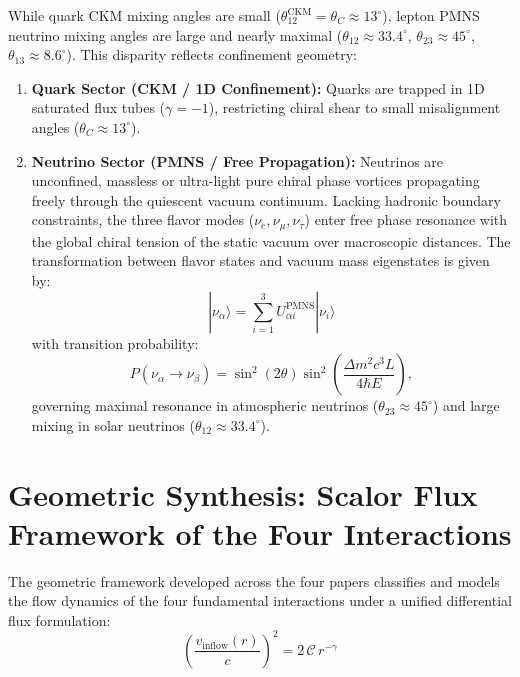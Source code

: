\documentclass[11pt,a4paper]{article}
\begin{document}
While quark CKM mixing angles are small ($\theta_{12}^{\mathrm{CKM}} = \theta_C \approx 13^\circ$), lepton PMNS~\cite{pmns1962} neutrino mixing angles are large and nearly maximal ($\theta_{12} \approx 33.4^\circ$, $\theta_{23} \approx 45^\circ$, $\theta_{13} \approx 8.6^\circ$). This disparity reflects confinement geometry:
\begin{enumerate}
    \item \textbf{Quark Sector (CKM / 1D Confinement):} Quarks are trapped in 1D saturated flux tubes ($\gamma = -1$), restricting chiral shear to small misalignment angles ($\theta_C \approx 13^\circ$).
    \item \textbf{Neutrino Sector (PMNS / Free Propagation):} Neutrinos are unconfined, massless or ultra-light pure chiral phase vortices propagating freely through the quiescent vacuum continuum. Lacking hadronic boundary constraints, the three flavor modes ($\nu_e, \nu_\mu, \nu_\tau$) enter free phase resonance with the global chiral tension of the static vacuum over macroscopic distances. The transformation between flavor states and vacuum mass eigenstates is given by:
          \begin{equation}
              |\nu_\alpha\rangle = \sum_{i=1}^3 U_{\alpha i}^{\mathrm{PMNS}} |\nu_i\rangle
              \label{eq:pmns_donusum_p4}
          \end{equation}
          with transition probability:
          \begin{equation}
              P(\nu_\alpha \to \nu_\beta) = \sin^2(2\theta) \sin^2\left( \frac{\Delta m^2 c^3 L}{4 \hbar E} \right),
              \label{eq:notrino_salinim_p4}
          \end{equation}
          governing maximal resonance in atmospheric neutrinos ($\theta_{23} \approx 45^\circ$) and large mixing in solar neutrinos ($\theta_{12} \approx 33.4^\circ$).
\end{enumerate}

\section{Geometric Synthesis: Scalor Flux Framework of the Four Interactions}
\label{sec:buyuk_sentez}

The geometric framework developed across the four papers classifies and models the flow dynamics of the four fundamental interactions under a unified differential flux formulation:
\begin{equation}
    \boxed{ \left( \frac{v_{\mathrm{inflow}}(r)}{c} \right)^2 = 2 \, \mathcal{C} \, r^{-\gamma} }
    \label{eq:master_sentez}
\end{equation}
\end{document}
